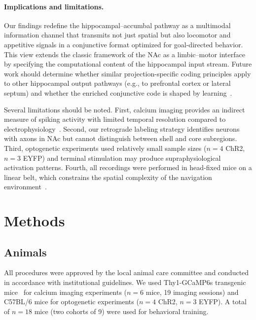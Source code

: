 \documentclass[11pt]{article}
\begin{document}
\paragraph{Implications and limitations.}
Our findings redefine the hippocampal--accumbal pathway as a multimodal information channel that transmits not just spatial but also locomotor and appetitive signals in a conjunctive format optimized for goal-directed behavior. This view extends the classic framework of the NAc as a limbic--motor interface~\citep{mogenson1980, groenewegen2007} by specifying the computational content of the hippocampal input stream. Future work should determine whether similar projection-specific coding principles apply to other hippocampal output pathways (e.g., to prefrontal cortex or lateral septum) and whether the enriched conjunctive code is shaped by learning~\citep{dupret2010}.

Several limitations should be noted. First, calcium imaging provides an indirect measure of spiking activity with limited temporal resolution compared to electrophysiology~\citep{chen2013}. Second, our retrograde labeling strategy identifies neurons with axons in NAc but cannot distinguish between shell and core subregions. Third, optogenetic experiments used relatively small sample sizes ($n=4$ ChR2, $n=3$ EYFP) and terminal stimulation may produce supraphysiological activation patterns. Fourth, all recordings were performed in head-fixed mice on a linear belt, which constrains the spatial complexity of the navigation environment~\citep{dombeck2010}.

\section{Methods}

\subsection{Animals}
All procedures were approved by the local animal care committee and conducted in accordance with institutional guidelines. We used Thy1-GCaMP6s transgenic mice~\citep{dana2014} for calcium imaging experiments ($n=6$ mice, 19 imaging sessions) and C57BL/6 mice for optogenetic experiments ($n=4$ ChR2, $n=3$ EYFP). A total of $n=18$ mice (two cohorts of 9) were used for behavioral training.
\end{document}

